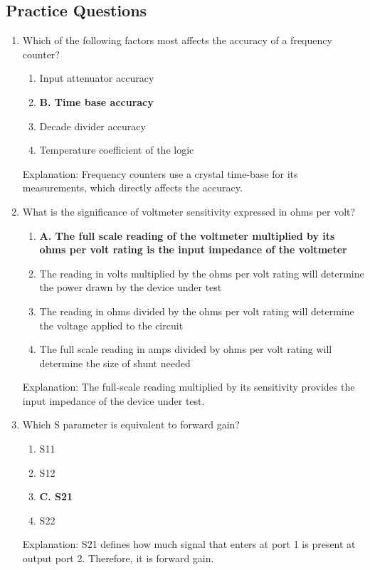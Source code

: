 \subsection*{Practice Questions}
\begin{enumerate}
     \item Which of the following factors most affects the accuracy of a frequency counter?
       \begin{enumerate}
      \item  Input attenuator accuracy
        \item \textbf{B. Time base accuracy}
        \item  Decade divider accuracy
      \item  Temperature coefficient of the logic
        \end{enumerate}
    \textcolor{myred}{Explanation:}
        Frequency counters use a crystal time-base for its measurements, which directly affects the accuracy.
   
    \item What is the significance of voltmeter sensitivity expressed in ohms per volt?
     \begin{enumerate}
      \item \textbf{A. The full scale reading of the voltmeter multiplied by its ohms per volt rating is the input impedance of the voltmeter}
      \item  The reading in volts multiplied by the ohms per volt rating will determine the power drawn by the device under test
      \item  The reading in ohms divided by the ohms per volt rating will determine the voltage applied to the circuit
     \item  The full scale reading in amps divided by ohms per volt rating will determine the size of shunt needed
        \end{enumerate}
    \textcolor{myred}{Explanation:}
    The full-scale reading multiplied by its sensitivity provides the input impedance of the device under test.

   \item Which S parameter is equivalent to forward gain?
        \begin{enumerate}
         \item  S11
         \item  S12
      \item \textbf{C. S21}
      \item  S22
    \end{enumerate}
         \textcolor{myred}{Explanation:}
     S21 defines how much signal that enters at port 1 is present at output port 2. Therefore, it is forward gain.


\end{enumerate}
